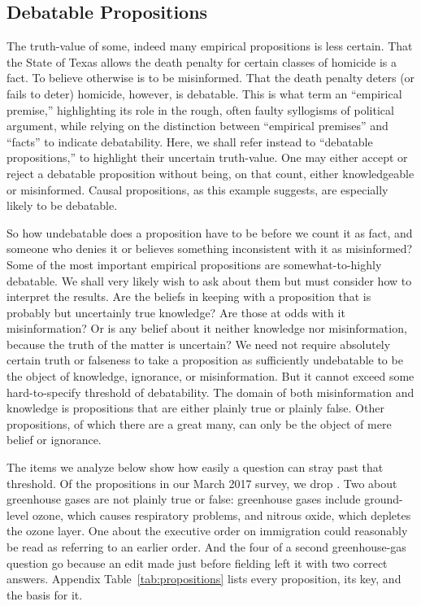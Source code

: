 \documentclass[11pt]{article}
\begin{document}
\subsection{Debatable Propositions}

The truth-value of some, indeed many empirical propositions is less certain. That the State of Texas allows the death penalty for certain classes of homicide is a fact. To believe otherwise is to be misinformed. That the death penalty deters (or fails to deter) homicide, however, is debatable. This is what \citet{luskin2002} term an ``empirical premise,'' highlighting its role in the rough, often faulty syllogisms of political argument, while relying on the distinction between ``empirical premises'' and ``facts'' to indicate debatability. Here, we shall refer instead to ``debatable propositions,'' to highlight their uncertain truth-value. One may either accept or reject a debatable proposition without being, on that count, either knowledgeable or misinformed. Causal propositions, as this example suggests, are especially likely to be debatable.

So how undebatable does a proposition have to be before we count it as fact, and someone who denies it or believes something inconsistent with it as misinformed? Some of the most important empirical propositions are somewhat-to-highly debatable. We shall very likely wish to ask about them but must consider how to interpret the results. Are the beliefs in keeping with a proposition that is probably but uncertainly true knowledge? Are those at odds with it misinformation? Or is any belief about it neither knowledge nor misinformation, because the truth of the matter is uncertain? We need not require absolutely certain truth or falseness to take a proposition as sufficiently undebatable to be the object of knowledge, ignorance, or misinformation. But it cannot exceed some hard-to-specify threshold of debatability. The domain of both misinformation and knowledge is propositions that are either plainly true or plainly false. Other propositions, of which there are a great many, can only be the object of mere belief or ignorance.

The items we analyze below show how easily a question can stray past that threshold. Of the \nMarchPropositions{} propositions in our March 2017 survey, we drop \nDropped{}. Two about greenhouse gases are not plainly true or false: greenhouse gases include ground-level ozone, which causes respiratory problems, and nitrous oxide, which depletes the ozone layer. One about the executive order on immigration could reasonably be read as referring to an earlier order. And the four of a second greenhouse-gas question go because an edit made just before fielding left it with two correct answers. Appendix Table~\ref{tab:propositions} lists every proposition, its key, and the basis for it.
\end{document}
